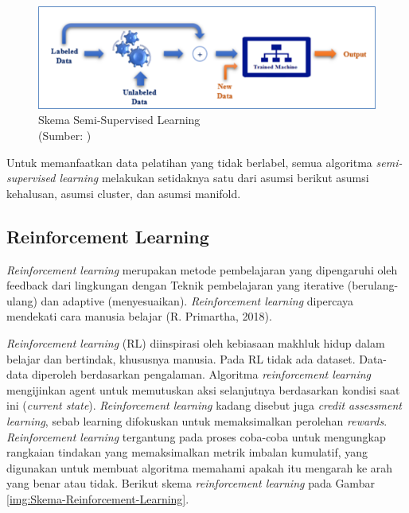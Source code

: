 \begin{figure}[H]
	\vspace{-0.1cm}
	\begin{center}
		\includegraphics[width=1\columnwidth]{bab2/Gambar/Picture10.png}
	\end{center}
	\vspace{-0.2cm}
	\captionsetup{justification=centering}
	\caption{Skema Semi-Supervised Learning\\(Sumber: )}\label{img:Skema-Semi-Supervised-Learning}
\end{figure}

Untuk memanfaatkan data pelatihan yang tidak berlabel, semua algoritma \textit{semi-supervised learning} melakukan setidaknya satu dari asumsi berikut asumsi kehalusan, asumsi cluster, dan asumsi manifold.

\subsection{Reinforcement Learning}
\hspace{1,2cm}\textit{Reinforcement learning} merupakan metode pembelajaran yang dipengaruhi oleh feedback dari lingkungan dengan Teknik pembelajaran yang iterative (berulang-ulang) dan adaptive (menyesuaikan). \textit{Reinforcement learning} dipercaya mendekati cara manusia belajar (R. Primartha, 2018). 

\textit{Reinforcement learning} (RL) diinspirasi oleh kebiasaan makhluk hidup dalam belajar dan bertindak, khususnya manusia. Pada RL tidak ada dataset. Data-data diperoleh berdasarkan pengalaman. Algoritma \textit{reinforcement learning} mengijinkan agent untuk memutuskan aksi selanjutnya berdasarkan kondisi saat ini (\textit{current state}). \textit{Reinforcement learning} kadang disebut juga \textit{credit assessment learning}, sebab learning difokuskan untuk memaksimalkan perolehan \textit{rewards}. \textit{Reinforcement learning} tergantung pada proses coba-coba untuk mengungkap rangkaian tindakan yang memaksimalkan metrik imbalan kumulatif, yang digunakan untuk membuat algoritma memahami apakah itu mengarah ke arah yang benar atau tidak. Berikut skema \textit{reinforcement learning} pada Gambar \ref{img:Skema-Reinforcement-Learning}. 

